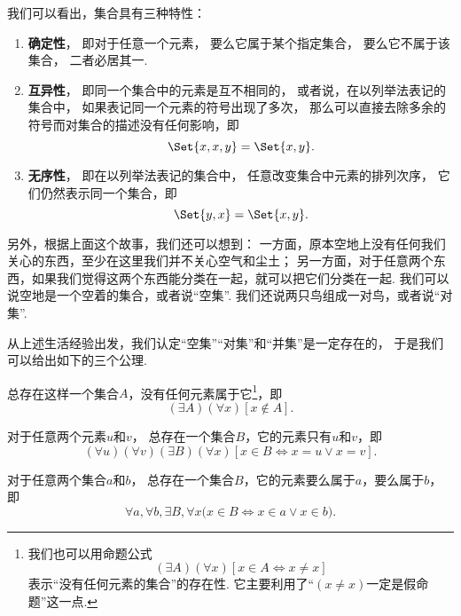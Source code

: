 我们可以看出，集合具有三种特性：
\begin{enumerate}
	\item {\bf 确定性}，
	即对于任意一个元素，
	要么它属于某个指定集合，
	要么它不属于该集合，
	二者必居其一.

	\item {\bf 互异性}，
	即同一个集合中的元素是互不相同的，
	或者说，在以列举法表记的集合中，
	如果表记同一个元素的符号出现了多次，
	那么可以直接去除多余的符号而对集合的描述没有任何影响，即\[
		\Set{ x, x, y } = \Set{ x, y }.
	\]

	\item {\bf 无序性}，
	即在以列举法表记的集合中，
	任意改变集合中元素的排列次序，
	它们仍然表示同一个集合，即\[
		\Set{ y, x } = \Set{ x, y }.
	\]
\end{enumerate}



另外，根据上面这个故事，我们还可以想到：
一方面，原本空地上没有任何我们关心的东西，至少在这里我们并不关心空气和尘土；
另一方面，对于任意两个东西，如果我们觉得这两个东西能分类在一起，就可以把它们分类在一起.
我们可以说空地是一个空着的集合，或者说“空集”.
我们还说两只鸟组成一对鸟，或者说“对集”.

从上述生活经验出发，我们认定“空集”“对集”和“并集”是一定存在的，
于是我们可以给出如下的三个公理.

\begin{axiom}[空集公理]\label{axiom:集合论.空集公理}
总存在这样一个集合\(A\)，没有任何元素属于它\footnote{%
我们也可以用命题公式\[
	(\exists A)(\forall x)[x \in A \iff x \neq x]
\]表示“没有任何元素的集合”的存在性.
它主要利用了“\((x \neq x)\)一定是假命题”这一点.
}，即\[
	(\exists A)(\forall x)[x \notin A].
\]
\end{axiom}

\begin{axiom}[对集公理]\label{axiom:集合论.对集公理}
对于任意两个元素\(u\)和\(v\)，
总存在一个集合\(B\)，它的元素只有\(u\)和\(v\)，即\[
	(\forall u)(\forall v)(\exists B)(\forall x)
	[x \in B \iff x = u \lor x = v].
\]
\end{axiom}

\begin{axiom}[并集公理I]
对于任意两个集合\(a\)和\(b\)，
总存在一个集合\(B\)，它的元素要么属于\(a\)，要么属于\(b\)，即\[
	\forall a, \forall b, \exists B, \forall x
	\bigl(
		x \in B
		\iff
		x \in a \lor x \in b
	\bigr).
\]
\end{axiom}

